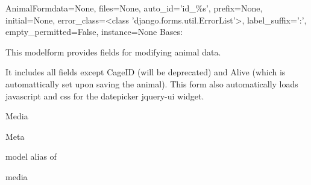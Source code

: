 \documentclass[letterpaper,10pt,english]{sphinxmanual}
\begin{document}
\hypertarget{animal.forms.AnimalForm}{}\begin{classdesc}{AnimalForm}{data=None, files=None, auto\_id='id\_\%s', prefix=None, initial=None, error\_class=\textless{}class 'django.forms.util.ErrorList'\textgreater{}, label\_suffix=':', empty\_permitted=False, instance=None}
Bases: 

This modelform provides fields for modifying animal data.

It includes all fields except CageID (will be deprecated) and Alive (which is automattically set upon saving the animal).
This form also automatically loads javascript and css for the datepicker jquery-ui widget.

\hypertarget{animal.forms.AnimalForm.Media}{}\begin{classdesc}{Media}{}\end{classdesc}

\hypertarget{animal.forms.AnimalForm.Meta}{}\begin{classdesc}{Meta}{}~

\hypertarget{animal.forms.AnimalForm.Meta.model}{}\begin{memberdesc}{model}
alias of 
\end{memberdesc}
\end{classdesc}

\hypertarget{animal.forms.AnimalForm.media}{}\begin{memberdesc}[AnimalForm]{media}\end{memberdesc}
\end{classdesc}
\end{document}
